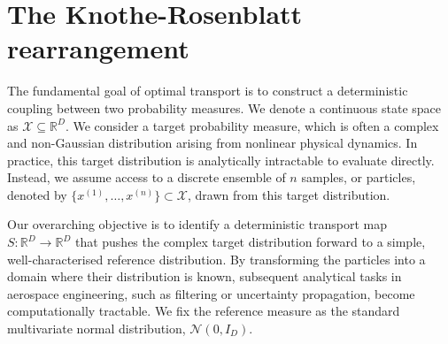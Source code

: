 \section{The Knothe-Rosenblatt rearrangement}
\label{sec:optimal_transport_kr}

The fundamental goal of optimal transport is to construct a deterministic coupling between two probability measures. We denote a continuous state space as $\mathcal{X} \subseteq \mathbb{R}^D$. We consider a target probability measure, which is often a complex and non-Gaussian distribution arising from nonlinear physical dynamics. In practice, this target distribution is analytically intractable to evaluate directly. Instead, we assume access to a discrete ensemble of $n$ samples, or particles, denoted by $\{x^{(1)}, \dots, x^{(n)}\} \subset \mathcal{X}$, drawn from this target distribution. 

Our overarching objective is to identify a deterministic transport map $S: \mathbb{R}^D \rightarrow \mathbb{R}^D$ that pushes the complex target distribution forward to a simple, well-characterised reference distribution. By transforming the particles into a domain where their distribution is known, subsequent analytical tasks in aerospace engineering, such as filtering or uncertainty propagation, become computationally tractable. We fix the reference measure as the standard multivariate normal distribution, $\mathcal{N}(0, I_D)$.

